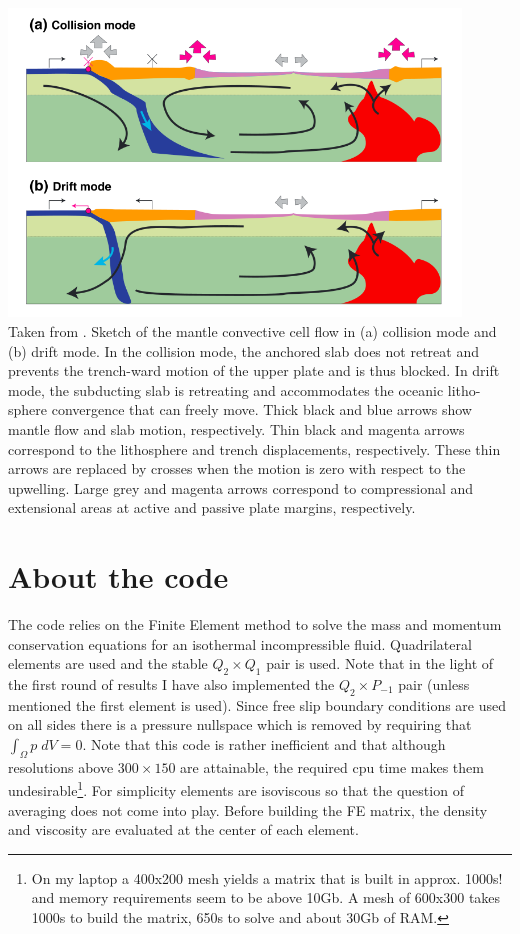 \begin{center}
\includegraphics[width=12cm]{python_codes/fieldstone_143/images/yahb13_b}\\
{\captionfont 
Taken from \cite{yahb13}. 
Sketch of the mantle convective cell flow in (a) collision mode and (b) drift mode. In the
collision mode, the anchored slab does not retreat and prevents the trench-ward motion of the upper plate
and is thus blocked. In drift mode, the subducting slab is retreating and accommodates the oceanic litho-
sphere convergence that can freely move. Thick black and blue arrows show mantle flow and slab motion,
respectively. Thin black and magenta arrows correspond to the lithosphere and trench displacements,
respectively. These thin arrows are replaced by crosses when the motion is zero with respect to the upwelling.
Large grey and magenta arrows correspond to compressional and extensional areas at active and passive plate
margins, respectively.
}
\end{center}

\section*{About the code}

The code relies on the Finite Element method to solve the mass and momentum conservation
equations for an isothermal incompressible fluid. 
Quadrilateral elements are used and the stable $Q_2\times Q_1$ pair is used.
Note that in the light of the first round of results I have also implemented
the $Q_2\times P_{-1}$ pair (unless mentioned the first element is used). 
Since free slip boundary conditions are used on all sides there is a pressure 
nullspace which is removed by requiring that $\int_\Omega p \; dV=0$.
Note that this code is rather inefficient and that although resolutions above $300 \times 150$ 
are attainable, the required cpu time makes them undesirable\footnote{On my laptop
a 400x200 mesh yields a matrix that is built in approx. 1000s! and memory requirements 
seem to be above 10Gb. A mesh of 600x300 takes 1000s to build the matrix, 650s to solve and about 
30Gb of RAM.}. 
For simplicity elements are isoviscous so that the question of averaging does not come into
play. Before building the FE matrix, the density and viscosity are evaluated at the
center of each element.

